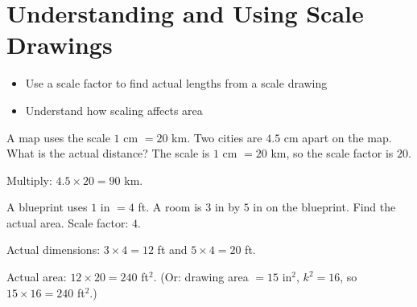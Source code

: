 \section{Understanding and Using Scale Drawings}

\begin{stepGoal}
\begin{itemize}
    \item Use a scale factor to find actual lengths from a scale drawing
    \item Understand how scaling affects area
\end{itemize}
\end{stepGoal}

\begin{stepVocabBox}
\end{stepVocabBox}

\begin{stepsCard}
\end{stepsCard}

\begin{stepExample}{A map uses the scale $1$ cm $= 20$ km. Two cities are $4.5$ cm apart on the map. What is the actual distance?}
     The scale is $1$ cm $= 20$ km, so the scale factor is $20$.

     Multiply: $4.5 \times 20 = 90$ km.
\end{stepExample}

\begin{stepExample}{A blueprint uses $1$ in $= 4$ ft. A room is $3$ in by $5$ in on the blueprint. Find the actual area.}
     Scale factor: $4$.

     Actual dimensions: $3 \times 4 = 12$ ft and $5 \times 4 = 20$ ft.

     Actual area: $12 \times 20 = 240$ ft$^{2}$. (Or: drawing area $= 15$ in$^{2}$, $k^{2} = 16$, so $15 \times 16 = 240$ ft$^{2}$.)
\end{stepExample}

